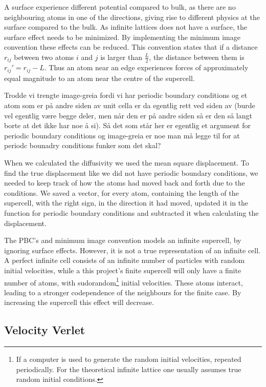 A surface experience different potential compared to bulk, as there are no neighbouring atoms in one of the directions, giving rise to different physics at the surface compared to the bulk. As infinite lattices does not have a surface, the surface effect needs to be minimized. By implementing the minimum image convention these effects can be reduced. This convention states that if a distance $ r_{ij} $ between two atoms $ i $ and $ j $ is larger than $ \frac{L}{2} $, the distance between them is $  r_{ij}'  = r_{ij}-L$. Thus an atom  near an edge experiences forces of approximately equal magnitude to an atom near the centre of the supercell. 

Trodde vi trengte image-greia fordi vi har periodic boundary conditions og et atom som er på andre siden av unit cella er da egentlig rett ved siden av (burde vel egentlig være begge deler, men når den er på andre siden så er den så langt borte at det ikke har noe å si). Så det som står her er egentlig et argument for periodic boundary conditions og image-greia er noe man må legge til for at periodc bounadry conditions funker som det skal?

When we calculated the diffusivity we used the mean square displacement. To find the true displacement like we did not have periodic boundary conditions, we needed to keep track of how the atoms had moved back and forth due to the conditions. We saved a vector, for every atom, containing the length of the supercell, with the right sign, in the direction it had moved, updated it in the function for periodic boundary conditions and subtracted it when calculating the displacement. 

The PBC's and minimum image convention models an infinite supercell, by ignoring surface effects. However, it is not a true representation of an infinite cell. A perfect infinite cell consists of an infinite number of particles with random initial velocities, while a this project's finite supercell will only have a finite number of atoms, with sudorandom\footnote{If a computer is used to generate the random initial velocities, repeated periodically. For the theoretical infinite lattice one usually assumes true random initial conditions.} initial velocities. These atoms interact, leading to a stronger codependence of the neighbours for the finite case. By increasing the supercell this effect will decrease.   	



\subsection{Velocity Verlet}

